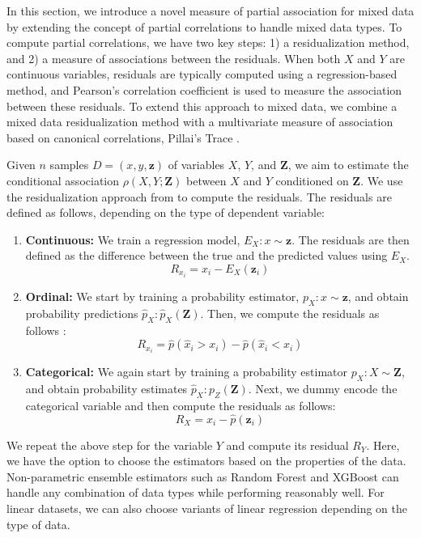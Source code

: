 \documentclass[letterpaper]{article} %
\begin{document}
In this section, we introduce a novel measure of partial association for mixed
data by extending the concept of partial correlations \citep{Whittaker2009}
 to handle mixed data types. To compute partial
correlations, we have two key steps: 1) a residualization method, and 2) a
measure of associations between the residuals. When both $ X $ and $ Y $ are
continuous variables, residuals are typically computed using a regression-based
method, and Pearson's correlation coefficient is used to measure the association
between these residuals. To extend this approach to mixed data, we combine a mixed
data residualization method \citep{Ankan2023} with a multivariate measure of
association based on canonical correlations, Pillai's Trace \citep{Pillai1955}. 

Given $ n $ samples $ D = (x, y, \bm{z}) $ of variables $ X $, $ Y $, and $
\bm{Z} $, we aim to estimate the conditional
association $ \rho(X, Y; \bm{Z}) $ between $ X $ and $ Y $ conditioned on $
\bm{Z} $. We use the residualization approach from \citet{Ankan2023} to compute 
the residuals. The residuals are defined as follows, depending on the type of 
dependent variable:

\begin{enumerate}
	\item \textbf{Continuous:} We train a regression model, $ E_X: x \sim
		\bm{z} $. The residuals are then defined as the difference
		between the true and the predicted values using $ E_X $. 
		$$ R_{x_i} = x_i - E_X(\bm{z}_i) $$
	\item \textbf{Ordinal:} We start by training a probability estimator, $
		p_X: x \sim \bm{z} $, and obtain probability predictions 
		$ \hat{p}_X: \hat{p}_X(\bm{Z}) $. Then, we compute the residuals
		as follows \citep{Li2012}:
		$$ R_{x_i} = \hat{p}(\hat{x}_i > x_i) - \hat{p}(\hat{x}_i < x_i) $$
	\item \textbf{Categorical:} We again start by training a probability
		estimator $ p_X: X \sim \bm{Z} $, and obtain probability
		estimates $ \hat{p}_X: p_Z(\bm{Z}) $. Next, we dummy encode the
		categorical variable and then compute the residuals as follows: 
		$$ R_X = x_i - \hat{p}(\bm{z}_i) $$
\end{enumerate}


We repeat the above step for the variable $ Y $ and compute its residual $ R_Y
$. Here, we have the option to choose the estimators based on the properties of
the data. Non-parametric ensemble estimators such as Random Forest and XGBoost
can handle any combination of data types while performing reasonably well. For
linear datasets, we can also choose variants of linear regression depending on
the type of data. 
\end{document}

